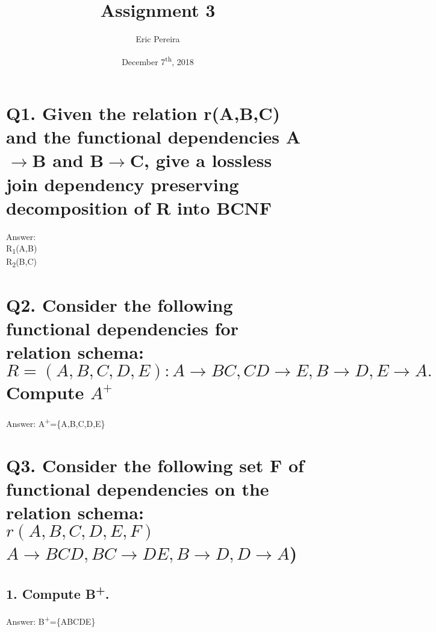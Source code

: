 \documentclass[12pt]{article}
\begin{document}
	

\begin{titlepage}
	
\author{Eric Pereira}
\date{December 7\textsuperscript{th}, 2018}
\title{Assignment 3}

\maketitle

\end{titlepage}

\tableofcontents

\newpage {}

\section*{Q1. Given the relation r(A,B,C) and the functional dependencies A$\rightarrow$B and B$\rightarrow$C, give a lossless join dependency preserving decomposition of R into BCNF}
%
Answer: \\
R\textsubscript{1}(A,B) \\
R\textsubscript{2}(B,C)
\section*{Q2. Consider the following functional dependencies for relation schema: \\
$R=(A,B,C,D,E):A\rightarrow BC, CD\rightarrow E, B \rightarrow D, E \rightarrow A.$ \\ Compute $A^+$}
%
Answer: A\textsuperscript{+}=\{A,B,C,D,E\}

\section*{Q3. Consider the following set F of functional dependencies on the relation schema: \\
$r(A,B,C,D,E,F)$ \\ 
$A\rightarrow BCD, BC\rightarrow DE, B\rightarrow D, D\rightarrow A$)}
%

\subsection*{1. Compute B\textsuperscript{+}.}
%
Answer: B\textsuperscript{+}=\{ABCDE\}
\end{document}
